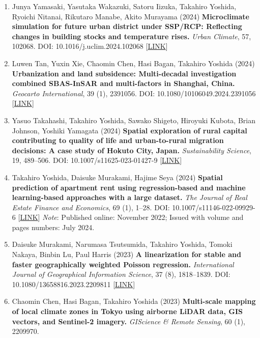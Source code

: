 \documentclass[
]{book}
\begin{document}
\begin{enumerate}
\item
  Junya Yamasaki, Yasutaka Wakazuki, Satoru Iizuka, Takahiro Yoshida, Ryoichi Nitanai, Rikutaro Manabe, Akito Murayama (2024)
  \textbf{Microclimate simulation for future urban district under SSP/RCP: Reflecting changes in building stocks and temperature rises.}
  \emph{Urban Climate}, 57, 102068.
  DOI: 10.1016/j.uclim.2024.102068 {[}\href{https://www.sciencedirect.com/science/article/pii/S2212095524002645}{LINK}{]}
\item
  Luwen Tan, Yuxin Xie, Chaomin Chen, Hasi Bagan, Takahiro Yoshida (2024)
  \textbf{Urbanization and land subsidence: Multi-decadal investigation combined SBAS-InSAR and multi-factors in Shanghai, China.}
  \emph{Geocarto International}, 39 (1), 2391056.
  DOI: 10.1080/10106049.2024.2391056 {[}\href{https://www.tandfonline.com/doi/full/10.1080/10106049.2024.2391056}{LINK}{]}
\item
  Yasuo Takahashi, Takahiro Yoshida, Sawako Shigeto, Hiroyuki Kubota, Brian Johnson, Yoshiki Yamagata (2024)
  \textbf{Spatial exploration of rural capital contributing to quality of life and urban-to-rural migration decisions: A case study of Hokuto City, Japan.}
  \emph{Sustainability Science}, 19, 489--506.
  DOI: 10.1007/s11625-023-01427-9 {[}\href{https://link.springer.com/article/10.1007/s11625-023-01427-9}{LINK}{]}
\item
  Takahiro Yoshida, Daisuke Murakami, Hajime Seya (2024)
  \textbf{Spatial prediction of apartment rent using regression-based and machine learning-based approaches with a large dataset.}
  \emph{The Journal of Real Estate Finance and Economics}, 69 (1), 1--28.
  DOI: 10.1007/s11146-022-09929-6 {[}\href{https://link.springer.com/article/10.1007/s11146-022-09929-6}{LINK}{]}
  \emph{Note}: Published online: November 2022; Issued with volume and pages numbers: July 2024.
\item
  Daisuke Murakami, Narumasa Tsutsumida, Takahiro Yoshida, Tomoki Nakaya, Binbin Lu, Paul Harris (2023)
  \textbf{A linearization for stable and faster geographically weighted Poisson regression.}
  \emph{International Journal of Geographical Information Science}, 37 (8), 1818--1839.
  DOI: 10.1080/13658816.2023.2209811 {[}\href{https://www.tandfonline.com/doi/full/10.1080/13658816.2023.2209811}{LINK}{]}
\item
  Chaomin Chen, Hasi Bagan, Takahiro Yoshida (2023)
  \textbf{Multi-scale mapping of local climate zones in Tokyo using airborne LiDAR data, GIS vectors, and Sentinel-2 imagery.}
  \emph{GIScience \& Remote Sensing}, 60 (1), 2209970.

\end{enumerate}
\end{document}
